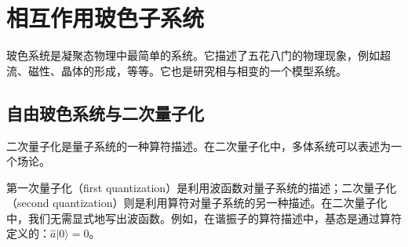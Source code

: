 
\chapter{相互作用玻色子系统}

玻色系统是凝聚态物理中最简单的系统。它描述了五花八门的物理现象，例如超流、磁性、晶体的形成，等等。它也是研究相与相变的一个模型系统。

\section{自由玻色系统与二次量子化}

\begin{keypoints}
\item 二次量子化是量子系统的一种算符描述。在二次量子化中，多体系统可以表述为一个场论。
\end{keypoints}

第一次量子化（first quantization）是利用波函数对量子系统的描述；二次量子化（second quantization）则是利用算符对量子系统的另一种描述。在二次量子化中，我们无需显式地写出波函数。例如，在谐振子的算符描述中，基态是通过算符定义的：$\hat{a}|0\rangle=0$。

